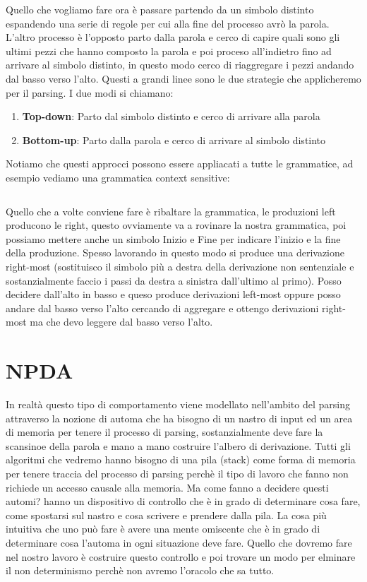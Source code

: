 Quello che vogliamo fare ora è passare partendo da un simbolo distinto espandendo una serie di regole per cui alla fine del processo avrò la parola.
L'altro processo è l'opposto parto dalla parola e cerco di capire quali sono gli ultimi pezzi che hanno composto la parola e poi proceso all'indietro fino ad arrivare al simbolo distinto, in questo modo cerco di riaggregare i pezzi andando dal basso verso l'alto.
Questi a grandi linee sono le due strategie che applicheremo per il parsing. I due modi si chiamano:
\begin{enumerate}
    \item \textbf{Top-down}: Parto dal simbolo distinto e cerco di arrivare alla parola
    \item \textbf{Bottom-up}: Parto dalla parola e cerco di arrivare al simbolo distinto
\end{enumerate}

Notiamo che questi approcci possono essere appliacati a tutte le grammatice, ad esempio vediamo una grammatica context sensitive:
\begin{lstlisting}
\end{lstlisting}

Quello che a volte conviene fare è ribaltare la grammatica, le produzioni left producono le right, questo ovviamente va a rovinare la nostra grammatica, poi possiamo mettere anche un simbolo Inizio e Fine per indicare l'inizio e la fine della produzione. Spesso lavorando in questo modo si produce una derivazione right-most (sostituisco il simbolo più a destra della derivazione non sentenziale e sostanzialmente faccio i passi da destra a sinistra dall'ultimo al primo). Posso decidere dall'alto in basso e queso produce derivazioni left-most oppure posso andare dal basso verso l'alto cercando di aggregare e ottengo derivazioni right-most ma che devo leggere dal basso verso l'alto.

\section{NPDA}
In realtà questo tipo di comportamento viene modellato nell'ambito del parsing attraverso la nozione di automa che ha bisogno di un nastro di input ed un area di memoria per tenere il processo di parsing, sostanzialmente deve fare la scansinoe della parola e mano a mano costruire l'albero di derivazione. Tutti gli algoritmi che vedremo hanno bisogno di una pila (stack) come forma di memoria per tenere traccia del processo di parsing perchè il tipo di lavoro che fanno non richiede un accesso causale alla memoria. Ma come fanno a decidere questi automi? hanno un dispositivo di controllo che è in grado di determinare cosa fare, come spostarsi sul nastro e cosa scrivere e prendere dalla pila. La cosa più intuitiva che uno può fare è avere una mente omiscente che è in grado di determinare cosa l'automa in ogni situazione deve fare. Quello che dovremo fare nel nostro lavoro è costruire questo controllo e poi trovare un modo per elminare il non determinismo perchè non avremo l'oracolo che sa tutto.

